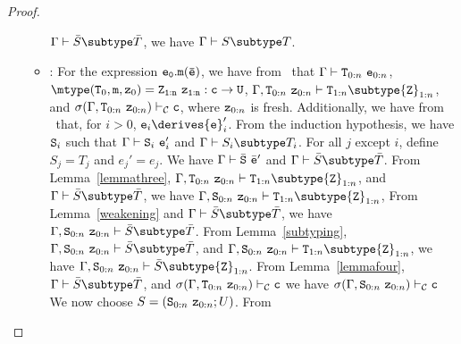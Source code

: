 \begin{proof}
\begin{itemize}
\begin{itemize}
            $\Gamma \vdash \bar{S} \subtype \bar{T}$, we have
            $\Gamma \vdash S \subtype T$.
   \item
   \RCInvkArg: For the expression ${\tt e_0.m(\bar{e})}$,
            we have from \TInvk\ that
            $\Gamma \vdash {\tt T}_{0:n} \ {\tt e}_{0:n}$,
            $\mtype({\tt T}_0,{\tt m},{\tt z}_0) = 
               \tt {\tt Z}_{1:n}\ {\tt z}_{1:n}:c \rightarrow {\tt U}$,
            $\Gamma, {\tt T}_{0:n}\ {\tt z}_{0:n} \vdash 
                  {\tt T}_{1:n} \subtype {\tt Z}_{1:n}$, and
            $\sigma(\Gamma, {\tt T}_{0:n}\ {\tt z}_{0:n}) \vdash_{\cal C}                          {\tt c}$, 
            where ${\tt z}_{0:n}$ is fresh.
            Additionally, we have from \RCInvkArg\ that, for $i>0$,
            ${\tt e}_i \derives {{\tt e}}_i'$.
            From the induction hypothesis, we have ${\tt S}_i$ such that
            $\Gamma \vdash {\tt S}_i\ {{\tt e}}_i'$ and 
            $\Gamma \vdash S_i \subtype T_i$.
            For all $j$ except $i$, define $S_j = T_j$ and $e_j' = e_j$.
            We have 
            $\Gamma \vdash \bar{\tt S}\ \bar{\tt e}'$ and
            $\Gamma \vdash \bar{S} \subtype \bar{T}$.
            From Lemma~\ref{lemmathree},
            $\Gamma, {\tt T}_{0:n}\ {\tt z}_{0:n} \vdash
                  {\tt T}_{1:n} \subtype {\tt Z}_{1:n}$,
            and $\Gamma \vdash \bar{S} \subtype \bar{T}$, we have
            $\Gamma, {\tt S}_{0:n}\ {\tt z}_{0:n} \vdash
                  {\tt T}_{1:n} \subtype {\tt Z}_{1:n}$,
            From Lemma~\ref{weakening} and 
            $\Gamma \vdash \bar{S} \subtype \bar{T}$, 
            we have 
            $\Gamma, {\tt S}_{0:n}\ {\tt z}_{0:n} \vdash 
                  \bar{S} \subtype \bar{T}$.
            From Lemma~\ref{subtyping},
            $\Gamma, {\tt S}_{0:n}\ {\tt z}_{0:n} \vdash 
                  \bar{S} \subtype \bar{T}$,
            and
            $\Gamma, {\tt S}_{0:n}\ {\tt z}_{0:n} \vdash
                    {\tt T}_{1:n} \subtype {\tt Z}_{1:n}$, 
            we have
            $\Gamma, {\tt S}_{0:n}\ {\tt z}_{0:n} \vdash 
                  \bar{S} \subtype {\tt Z}_{1:n}$.
            From Lemma~\ref{lemmafour}, 
            $\Gamma \vdash \bar{S} \subtype \bar{T}$, and
            $\sigma(\Gamma, {\tt T}_{0:n}\ {\tt z}_{0:n}) \vdash_{\cal C}
                              {\tt c}$
            we have
            $\sigma(\Gamma, {\tt S}_{0:n}\ {\tt z}_{0:n}) \vdash_{\cal C}
                              {\tt c}$
            We now choose 
               $S=({\tt S}_{0:n}\ {\tt z}_{0:n}; U)$.
            From 

\end{itemize}
\end{itemize}
\end{proof}
